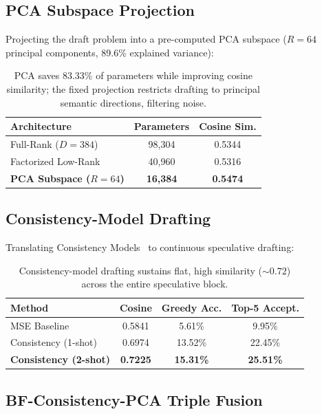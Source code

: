 \documentclass[11pt,a4paper]{article}
\begin{document}
\subsection{PCA Subspace Projection}
Projecting the draft problem into a pre-computed PCA subspace ($R=64$ principal components, 89.6\% explained variance):

\begin{table}[H]
\centering
\small
\begin{tabular}{@{}lcc@{}}
\toprule
\textbf{Architecture} & \textbf{Parameters} & \textbf{Cosine Sim.} \\
\midrule
Full-Rank ($D\!=\!384$) & 98,304 & 0.5344 \\
Factorized Low-Rank & 40,960 & 0.5316 \\
\textbf{PCA Subspace ($R\!=\!64$)} & \textbf{16,384} & \textbf{0.5474} \\
\bottomrule
\end{tabular}
\caption{PCA saves 83.33\% of parameters while improving cosine similarity; the fixed projection restricts drafting to principal semantic directions, filtering noise.}
\label{tab:pca}
\end{table}

\subsection{Consistency-Model Drafting}

Translating Consistency Models~\cite{song2023consistency} to continuous speculative drafting:

\begin{table}[H]
\centering
\small
\begin{tabular}{@{}lccc@{}}
\toprule
\textbf{Method} & \textbf{Cosine} & \textbf{Greedy Acc.} & \textbf{Top-5 Accept.} \\
\midrule
MSE Baseline & 0.5841 & 5.61\% & 9.95\% \\
Consistency (1-shot) & 0.6974 & 13.52\% & 22.45\% \\
\textbf{Consistency (2-shot)} & \textbf{0.7225} & \textbf{15.31\%} & \textbf{25.51\%} \\
\bottomrule
\end{tabular}
\caption{Consistency-model drafting sustains flat, high similarity (${\sim}0.72$) across the entire speculative block.}
\label{tab:consistency}
\end{table}

\subsection{BF-Consistency-PCA Triple Fusion}
\end{document}
